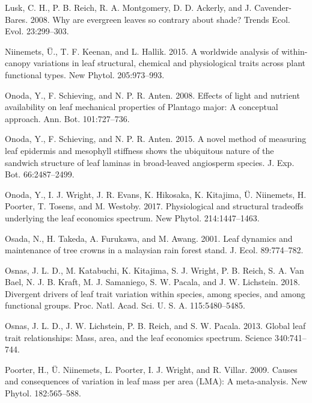 \documentclass[
  12pt,
]{article}
\newlength{\cslhangindent}
\newenvironment{cslreferences}%
  {\setlength{\parindent}{0pt}%
  \everypar{\setlength{\hangindent}{\cslhangindent}}\ignorespaces}%
  {\par}
\begin{document}
\begin{cslreferences}
\leavevmode\hypertarget{ref-Lusk2008}{}%
Lusk, C. H., P. B. Reich, R. A. Montgomery, D. D. Ackerly, and J. Cavender-Bares. 2008. Why are evergreen leaves so contrary about shade? Trends Ecol. Evol. 23:299--303.

\leavevmode\hypertarget{ref-Niinemets2015}{}%
Niinemets, Ü., T. F. Keenan, and L. Hallik. 2015. A worldwide analysis of within-canopy variations in leaf structural, chemical and physiological traits across plant functional types. New Phytol. 205:973--993.

\leavevmode\hypertarget{ref-Onoda2008}{}%
Onoda, Y., F. Schieving, and N. P. R. Anten. 2008. Effects of light and nutrient availability on leaf mechanical properties of Plantago major: A conceptual approach. Ann. Bot. 101:727--736.

\leavevmode\hypertarget{ref-Onoda2015}{}%
Onoda, Y., F. Schieving, and N. P. R. Anten. 2015. A novel method of measuring leaf epidermis and mesophyll stiffness shows the ubiquitous nature of the sandwich structure of leaf laminas in broad-leaved angiosperm species. J. Exp. Bot. 66:2487--2499.

\leavevmode\hypertarget{ref-Onoda2017}{}%
Onoda, Y., I. J. Wright, J. R. Evans, K. Hikosaka, K. Kitajima, Ü. Niinemets, H. Poorter, T. Tosens, and M. Westoby. 2017. Physiological and structural tradeoffs underlying the leaf economics spectrum. New Phytol. 214:1447--1463.

\leavevmode\hypertarget{ref-Osada2001}{}%
Osada, N., H. Takeda, A. Furukawa, and M. Awang. 2001. Leaf dynamics and maintenance of tree crowns in a malaysian rain forest stand. J. Ecol. 89:774--782.

\leavevmode\hypertarget{ref-Osnas2018}{}%
Osnas, J. L. D., M. Katabuchi, K. Kitajima, S. J. Wright, P. B. Reich, S. A. Van Bael, N. J. B. Kraft, M. J. Samaniego, S. W. Pacala, and J. W. Lichstein. 2018. Divergent drivers of leaf trait variation within species, among species, and among functional groups. Proc. Natl. Acad. Sci. U. S. A. 115:5480--5485.

\leavevmode\hypertarget{ref-Osnas2013}{}%
Osnas, J. L. D., J. W. Lichstein, P. B. Reich, and S. W. Pacala. 2013. Global leaf trait relationships: Mass, area, and the leaf economics spectrum. Science 340:741--744.

\leavevmode\hypertarget{ref-Poorter2009}{}%
Poorter, H., Ü. Niinemets, L. Poorter, I. J. Wright, and R. Villar. 2009. Causes and consequences of variation in leaf mass per area (LMA): A meta-analysis. New Phytol. 182:565--588.


\end{cslreferences}
\end{document}
